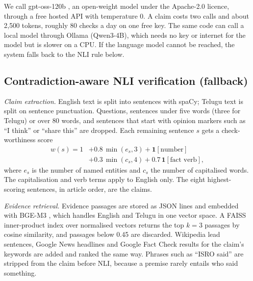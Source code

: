 \documentclass[conference]{IEEEtran}
\begin{document}
We call gpt-oss-120b \cite{openai2025gptoss}, an open-weight model under the Apache-2.0 licence, through a free hosted API with temperature 0. A claim costs two calls and about 2,500 tokens, roughly 80 checks a day on one free key. The same code can call a local model through Ollama (Qwen3-4B), which needs no key or internet for the model but is slower on a CPU. If the language model cannot be reached, the system falls back to the NLI rule below.

\subsection{Contradiction-aware NLI verification (fallback)}
\label{sec:verify}

\textit{Claim extraction.} English text is split into sentences with spaCy; Telugu text is split on sentence punctuation. Questions, sentences under five words (three for Telugu) or over 80 words, and sentences that start with opinion markers such as ``I think'' or ``share this'' are dropped. Each remaining sentence $s$ gets a check-worthiness score
\begin{equation}
\begin{split}
w(s) = 1 &+ 0.8\,\min(e_s,3) + \mathbf{1}[\text{number}]\\
&+ 0.3\,\min(c_s,4) + 0.7\,\mathbf{1}[\text{fact verb}],
\end{split}
\end{equation}
where $e_s$ is the number of named entities and $c_s$ the number of capitalised words. The capitalisation and verb terms apply to English only. The eight highest-scoring sentences, in article order, are the claims.

\textit{Evidence retrieval.} Evidence passages are stored as JSON lines and embedded with BGE-M3 \cite{chen2024bgem3}, which handles English and Telugu in one vector space. A FAISS inner-product index \cite{johnson2021faiss} over normalised vectors returns the top $k=3$ passages by cosine similarity, and passages below 0.45 are discarded. Wikipedia lead sentences, Google News headlines and Google Fact Check results for the claim's keywords are added and ranked the same way. Phrases such as ``ISRO said'' are stripped from the claim before NLI, because a premise rarely entails who said something.
\end{document}
